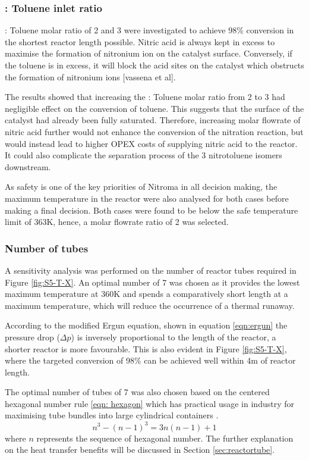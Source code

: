 \subsubsection{ : Toluene inlet ratio}

 : Toluene molar ratio of 2 and 3 were investigated to achieve 98\% conversion in the shortest reactor length possible. Nitric acid is always kept in excess to maximise the formation of nitronium ion on the catalyst surface. Conversely, if the toluene is in excess, it will block the acid sites on the catalyst which obstructs the formation of nitronium ions [vassena et al]. 

The results showed that increasing the  : Toluene molar ratio from 2 to 3 had negligible effect on the conversion of toluene. This suggests that the surface of the catalyst had already been fully saturated. Therefore, increasing molar flowrate of nitric acid further would not enhance the conversion of the nitration reaction, but would instead lead to higher OPEX costs of supplying nitric acid to the reactor. It could also complicate the separation process of the 3 nitrotoluene isomers downstream. 

As safety is one of the key priorities of Nitroma in all decision making, the maximum temperature in the reactor were also analysed for both cases before making a final decision. Both cases were found to be below the safe temperature limit of 363K, hence, a molar flowrate ratio of 2 was selected.

\subsubsection{Number of tubes}
A sensitivity analysis was performed on the number of reactor tubes required in Figure \ref{fig:S5-T-X}. An optimal number of 7 was chosen as it provides the lowest maximum temperature at 360K and spends a comparatively short length at a maximum temperature, which will reduce the occurrence of a thermal runaway.

According to the modified Ergun equation, shown in equation \ref{eqn:ergun} the pressure drop ($\Delta p$) is inversely proportional to the length of the reactor, a shorter reactor is more favourable.  This is also evident in Figure \ref{fig:S5-T-X}, where the targeted conversion of 98\% can be achieved well within 4m of reactor length. 

The optimal number of tubes of 7 was also chosen based on the centered hexagonal number rule \cref{eqn: hexagon} which has practical usage in industry for maximising tube bundles into large cylindrical containers \cite{noauthor_realiable_2018}. 
\begin{equation}
    n^3 - (n-1)^3 = 3n(n-1)+1
    \label{eqn: hexagon}
\end{equation}
where $n$ represents the sequence of hexagonal number. The further explanation on the heat transfer benefits will be discussed in Section \ref{sec:reactortube}.


